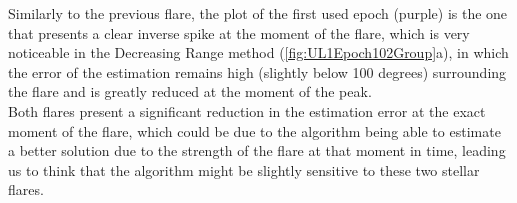 Similarly to the previous flare, the plot of the first used epoch (purple) is the one that presents a clear inverse spike at the moment of the flare, which is very noticeable in the Decreasing Range method (\ref{fig:UL1Epoch102Group}a), in which the error of the estimation remains high (slightly below 100 degrees) surrounding the flare and is greatly reduced at the moment of the peak.\\

Both flares present a significant reduction in the estimation error at the exact moment of the flare, which could be due to the algorithm being able to estimate a better solution due to the strength of the flare at that moment in time, leading us to think that the algorithm might be slightly sensitive to these two stellar flares.



















